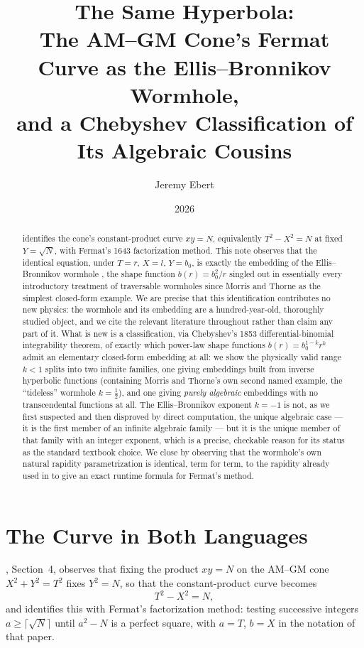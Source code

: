 \documentclass[12pt]{amsart}
\title[The Cone's Fermat Curve as the Ellis--Bronnikov Wormhole]{The Same Hyperbola:\\
The AM--GM Cone's Fermat Curve as the Ellis--Bronnikov Wormhole,\\
and a Chebyshev Classification of Its Algebraic Cousins}
\author{Jeremy Ebert}
\date{2026}
\theoremstyle{plain}
\theoremstyle{remark}
\begin{document}
\maketitle

\begin{abstract}
\cite{Ebert2026Table} identifies the cone's constant-product curve $xy=N$, equivalently $T^2-X^2=N$ at fixed $Y=\sqrt N$, with Fermat's 1643 factorization method. This note observes that the identical equation, under $T=r$, $X=l$, $Y=b_0$, is exactly the embedding of the Ellis--Bronnikov wormhole \cite{Ellis1973,Bronnikov1973}, the shape function $b(r)=b_0^2/r$ singled out in essentially every introductory treatment of traversable wormholes since Morris and Thorne \cite{MorrisThorne1988} as the simplest closed-form example. We are precise that this identification contributes no new physics: the wormhole and its embedding are a hundred-year-old, thoroughly studied object, and we cite the relevant literature throughout rather than claim any part of it. What is new is a classification, via Chebyshev's 1853 differential-binomial integrability theorem, of exactly which power-law shape functions $b(r)=b_0^{1-k}r^k$ admit an elementary closed-form embedding at all: we show the physically valid range $k<1$ splits into two infinite families, one giving embeddings built from inverse hyperbolic functions (containing Morris and Thorne's own second named example, the ``tideless'' wormhole $k=\tfrac12$), and one giving \emph{purely algebraic} embeddings with no transcendental functions at all. The Ellis--Bronnikov exponent $k=-1$ is not, as we first suspected and then disproved by direct computation, the unique algebraic case --- it is the first member of an infinite algebraic family --- but it is the unique member of that family with an integer exponent, which is a precise, checkable reason for its status as the standard textbook choice. We close by observing that the wormhole's own natural rapidity parametrization is identical, term for term, to the rapidity already used in \cite{Ebert2026EigenCoord} to give an exact runtime formula for Fermat's method.
\end{abstract}

\section{The Curve in Both Languages}

\cite{Ebert2026Table}, Section~4, observes that fixing the product $xy=N$ on the AM--GM cone $X^2+Y^2=T^2$ fixes $Y^2=N$, so that the constant-product curve becomes
\begin{equation}
T^2-X^2=N, \tag{1}
\end{equation}
and identifies this with Fermat's factorization method: testing successive integers $a\ge\lceil\sqrt N\rceil$ until $a^2-N$ is a perfect square, with $a=T$, $b=X$ in the notation of that paper.
\end{document}
